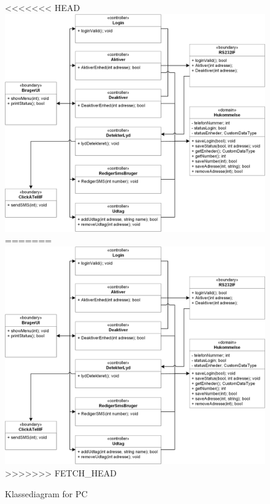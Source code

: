 \begin{figure}[!htb]
<<<<<<< HEAD
     {\includegraphics[width=\textwidth]{billeder/uml/PC_Class}}
=======
     \includegraphics{billeder/uml/PC_Class}
>>>>>>> FETCH_HEAD
     \caption{Klassediagram for PC}
     \label{fig:PC_Class}
\end{figure}
%
